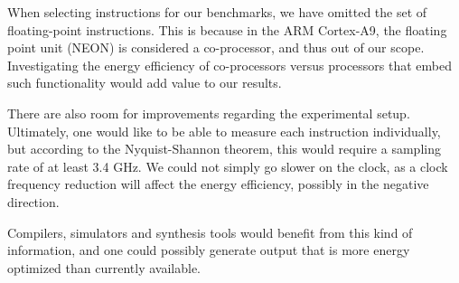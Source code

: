 When selecting instructions for our benchmarks, we have omitted the set of
floating-point instructions. This is because in the ARM Cortex-A9, the floating
point unit (NEON) is considered a co-processor\cite{armtech}, and thus out of
our scope. Investigating the energy efficiency of co-processors versus
processors that embed such functionality would add value to our results.

There are also room for improvements regarding the experimental setup.
Ultimately, one would like to be able to measure each instruction individually,
but according to the Nyquist-Shannon theorem\cite{shannon1949communication},
this would require a sampling rate of at least 3.4 GHz. We could not simply
go slower on the clock, as a clock frequency reduction will affect the
energy efficiency, possibly in the negative direction\cite{burd1995energy}.

Compilers, simulators and synthesis tools would benefit from this kind of
information, and one could possibly generate output that is more energy
optimized than currently available.

